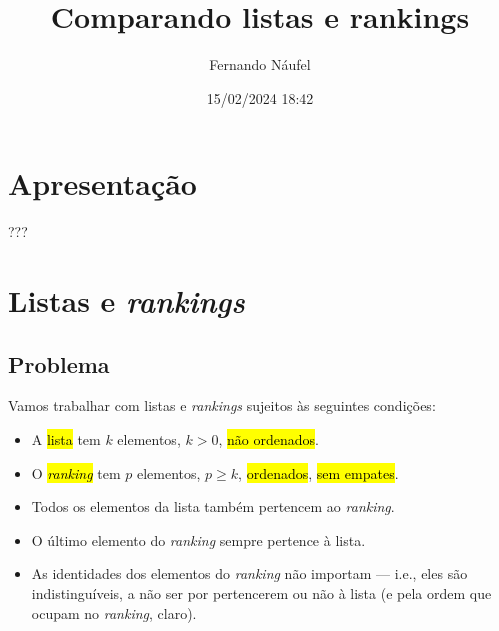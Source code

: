 \documentclass[
  letterpaper,
  DIV=11,
  numbers=noendperiod]{scrreprt}
\title{Comparando listas e rankings}
\author{Fernando Náufel}
\date{15/02/2024 18:42}
\renewcommand*\contentsname{Índice}
\newcommand\contentsname{Índice}
\begin{document}
\maketitle

\makeatletter
{}
{}
{}
\makeatother


\renewcommand*\contentsname{Índice}
{
\hypersetup{linkcolor=}
\setcounter{tocdepth}{2}
\tableofcontents
}

\chapter*{Apresentação}\label{apresentauxe7uxe3o}


???


\chapter{\texorpdfstring{Listas e
\emph{rankings}}{Listas e rankings}}\label{listas-e-rankings}

\section{Problema}\label{problema}

Vamos trabalhar com listas e \emph{rankings} sujeitos às seguintes
condições:

\begin{itemize}
\item
  A {\hl{lista}} tem $k$ elementos, $k > 0$, {\hl{não ordenados}}.
\item
  O {\hl{\emph{ranking}}} tem $p$ elementos, $p \geq k$,
  {\hl{ordenados}}, {\hl{sem empates}}.
\item
  Todos os elementos da lista também pertencem ao \emph{ranking}.
\item
  O último elemento do \emph{ranking} sempre pertence à lista.
\item
  As identidades dos elementos do \emph{ranking} não importam --- i.e.,
  eles são indistinguíveis, a não ser por pertencerem ou não à lista (e
  pela ordem que ocupam no \emph{ranking}, claro).
\end{itemize}
\end{document}
